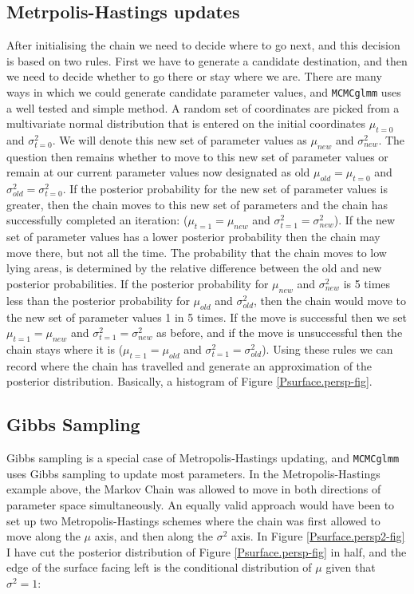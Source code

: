 \documentclass{article}
\begin{document}
\subsection{Metrpolis-Hastings updates}

After initialising the chain we need to decide where to go next, and this decision is based on two rules.  First we have to generate a candidate destination, and then we need to decide whether to go there or stay where we are.  There are many ways in which we could generate candidate parameter values, and \texttt{MCMCglmm} uses a well tested and simple method. A random set of coordinates are picked from a multivariate normal distribution that is entered on the initial coordinates  $\mu_{t=0}$ and $\sigma^{2}_{t=0}$.  We will denote this new set of parameter values as  $\mu_{new}$ and $\sigma^{2}_{new}$. The question then remains whether to move to this new set of parameter values or remain at our current parameter values now designated as old $\mu_{old}=\mu_{t=0}$ and $\sigma^{2}_{old}=\sigma^{2}_{t=0}$.  If the posterior probability for the new set of parameter values is greater, then the chain moves to this new set of parameters and the chain has successfully completed an iteration: ($\mu_{t=1} = \mu_{new}$ and $\sigma^{2}_{t=1}=\sigma^{2}_{new}$).  If the new set of parameter values has a lower posterior probability then the chain may move there, but not all the time.  The probability that the chain moves to low lying areas, is determined by the relative difference between the old and new posterior probabilities.  If the posterior probability for $\mu_{new}$ and $\sigma^{2}_{new}$ is 5 times less than the posterior probability for $\mu_{old}$ and $\sigma^{2}_{old}$, then the chain would move to the new set of parameter values 1 in 5 times. If the move is successful then we set $\mu_{t=1} = \mu_{new}$ and $\sigma^{2}_{t=1}=\sigma^{2}_{new}$ as before, and if the move is unsuccessful then the chain stays where it is ($\mu_{t=1} = \mu_{old}$ and $\sigma^{2}_{t=1}=\sigma^{2}_{old}$).  Using these rules we can record where the chain has travelled and generate an approximation of the posterior distribution.  Basically, a histogram of Figure \ref{Psurface.persp-fig}.\\
 
\subsection{Gibbs Sampling}

Gibbs sampling is a special case of Metropolis-Hastings updating, and \texttt{MCMCglmm} uses Gibbs sampling to update most parameters.  In the Metropolis-Hastings example above, the Markov Chain was allowed to move in both directions of parameter space simultaneously.  An equally valid approach would have been to set up two Metropolis-Hastings schemes where the chain was first allowed to move along the $\mu$ axis, and then along the $\sigma^{2}$ axis. In Figure \ref{Psurface.persp2-fig} I have cut the posterior distribution of Figure \ref{Psurface.persp-fig} in half, and the edge of the surface facing left is the conditional distribution of $\mu$ given that $\sigma^{2}=1$:
\end{document}
